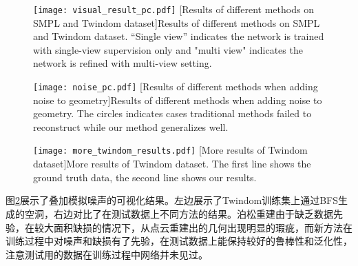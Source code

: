 \begin{figure}
    \centering
    \texttt{[image: visual\_result\_pc.pdf]}
    [Results of different methods on SMPL and Twindom dataset]{Results of different methods on SMPL and Twindom dataset. “Single view” indicates the network is trained with single-view supervision only and "multi view" indicates the network is refined with multi-view setting.}
    \label{fig:pc_visual}
\end{figure}


\begin{figure}
    \centering
    \texttt{[image: noise\_pc.pdf]}
    [Results of different methods when adding noise to geometry]{Results of different methods when adding noise to geometry. The circles indicates cases traditional methods failed to reconstruct while our method generalizes well.}
    \label{fig:pc_noise}
\end{figure}

\begin{figure}
    \centering
    \texttt{[image: more\_twindom\_results.pdf]}
    [More results of Twindom dataset]{More results of Twindom dataset. The first line shows the ground truth data, the second line shows our results.}
    \label{fig:pc_more_twindom}
\end{figure}

图\ref{fig:pc_noise}展示了叠加模拟噪声的可视化结果。左边展示了Twindom训练集上通过BFS生成的空洞，右边对比了在测试数据上不同方法的结果。泊松重建由于缺乏数据先验，在较大面积缺损的情况下，从点云重建出的几何出现明显的瑕疵，而新方法在训练过程中对噪声和缺损有了先验，在测试数据上能保持较好的鲁棒性和泛化性，注意测试用的数据在训练过程中网络并未见过。


